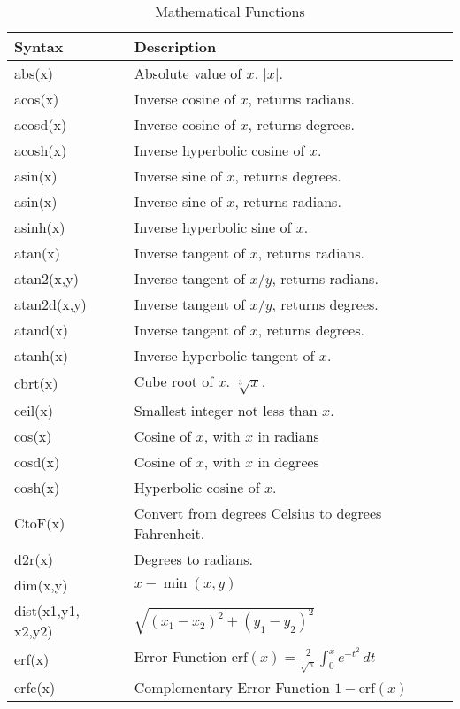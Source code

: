 \begin{longtable}{lp{4.0in}}
\caption{Mathematical Functions}\label{t:functions}\\
Syntax              & Description \\
\hline
\endhead
abs(x)              &  Absolute value of $x$. $|x|$.\\
acos(x)             &  Inverse cosine of $x$, returns radians.\\
acosd(x)            &  Inverse cosine of $x$, returns degrees.\\
acosh(x)            &  Inverse hyperbolic cosine of $x$.\\
asin(x)             &  Inverse sine of $x$, returns degrees.\\
asin(x)             &  Inverse sine of $x$, returns radians.\\
asinh(x)            &  Inverse hyperbolic sine of $x$.\\
atan(x)             &  Inverse tangent of $x$, returns radians.\\
atan2(x,y)          &  Inverse tangent of $x/y$, returns radians.\\
atan2d(x,y)         &  Inverse tangent of $x/y$, returns degrees.\\
atand(x)            &  Inverse tangent of $x$, returns degrees.\\
atanh(x)            &  Inverse hyperbolic tangent of $x$.\\
cbrt(x)             &  Cube root of $x$. $\sqrt[3]{x}$. \\
ceil(x)             &  Smallest integer not less than $x$.\\
cos(x)              &  Cosine of $x$, with $x$ in radians\\
cosd(x)             &  Cosine of $x$, with $x$ in degrees\\
cosh(x)             &  Hyperbolic cosine of $x$.\\
CtoF(x)             &  Convert from degrees Celsius to degrees Fahrenheit. \\
d2r(x)              &  Degrees to radians.\\
dim(x,y)            &  $x - \min(x,y)$\\
dist(x1,y1, x2,y2)  &  $\sqrt{(x_1-x_2)^2 + (y_1-y_2)^2}$ \\
erf(x)              &  Error Function $\mathrm{erf}(x)=\frac{2}{\sqrt{\pi}}\int_{0}^{x}e^{-t^{2}}\, dt$ \\
erfc(x)             &  Complementary Error Function $1-\mathrm{erf}(x)$ \\

\end{longtable}
